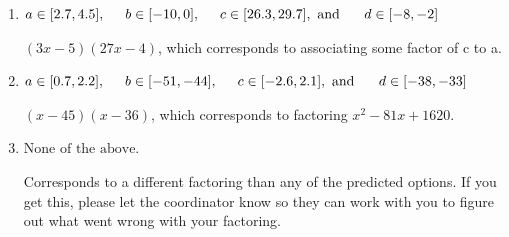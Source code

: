\documentclass{extbook}[14pt]
\begin{document}
\begin{enumerate}
{\begin{enumerate}[label=\Alph*.]
* $(9x -5)(9x -4)$, which is the correct option.
\item \( a \in [2.7, 4.5], \hspace*{5mm} b \in [-10, 0], \hspace*{5mm} c \in [26.3, 29.7], \text{ and } \hspace*{5mm} d \in [-8, -2] \)

 $(3x -5)(27x -4)$, which corresponds to associating some factor of c to a.
\item \( a \in [0.7, 2.2], \hspace*{5mm} b \in [-51, -44], \hspace*{5mm} c \in [-2.6, 2.1], \text{ and } \hspace*{5mm} d \in [-38, -33] \)

 $(x -45)(x -36)$, which corresponds to factoring $x^{2} -81 x + 1620$.
\item \( \text{None of the above.} \)

 Corresponds to a different factoring than any of the predicted options. If you get this, please let the coordinator know so they can work with you to figure out what went wrong with your factoring.
\end{enumerate}

}
\end{enumerate}
\end{document}

